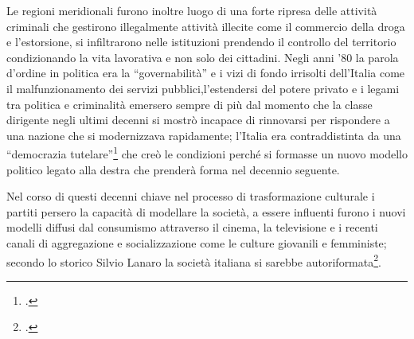 Le regioni meridionali furono inoltre luogo di una forte ripresa delle attività criminali che gestirono illegalmente attività illecite come il commercio della droga e l'estorsione, si infiltrarono nelle istituzioni prendendo il controllo del territorio condizionando la vita lavorativa e non solo dei cittadini.
Negli anni '80 la parola d'ordine in politica era la \enquote{governabilità} e i vizi di fondo irrisolti dell'Italia come il malfunzionamento dei servizi pubblici,l'estendersi del potere privato e i legami tra politica e criminalità emersero sempre di più dal momento che la classe dirigente negli ultimi decenni si mostrò incapace di rinnovarsi per rispondere a una nazione che si modernizzava rapidamente; l'Italia era contraddistinta da una \enquote{democrazia tutelare}\footcite{Casalino} che creò le condizioni perché si formasse un nuovo modello politico legato alla destra che prenderà forma nel decennio seguente.

Nel corso di questi decenni chiave nel processo di trasformazione culturale i partiti persero la capacità di modellare la società, a essere influenti furono i nuovi modelli diffusi dal consumismo attraverso il cinema, la televisione e i recenti canali di aggregazione e socializzazione come le culture giovanili e femministe; secondo lo storico Silvio Lanaro la società italiana si sarebbe autoriformata\footcite{Balestracci2}.
